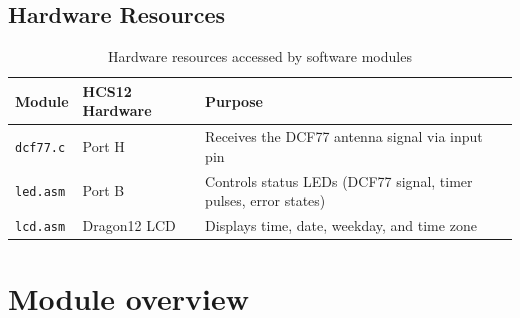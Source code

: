 \documentclass[a4paper,12pt]{article}
\begin{document}

\subsection{Hardware Resources}

\begin{table}[H]
\centering
\renewcommand{\arraystretch}{1.3}
\begin{tabularx}{\textwidth}{|L{3cm}|L{3.5cm}|X|}
\hline
\textbf{Module} & \textbf{HCS12 Hardware} & \textbf{Purpose} \\
\hline
\texttt{dcf77.c} & Port H & Receives the DCF77 antenna signal via input pin \\
\hline
\texttt{led.asm} & Port B & Controls status LEDs (DCF77 signal, timer pulses, error states) \\
\hline
\texttt{lcd.asm} & Dragon12 LCD & Displays time, date, weekday, and time zone \\
\hline
\end{tabularx}
\caption{Hardware resources accessed by software modules}
\end{table}

\newpage


\section{Module overview}
\end{document}

